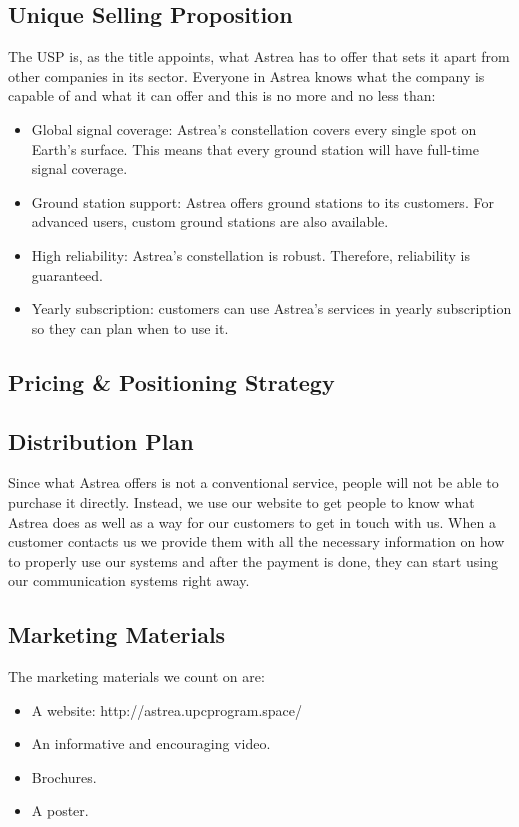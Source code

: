 \subsection{Unique Selling Proposition}
The USP is, as the title appoints, what Astrea has to offer that sets it apart from other companies in its sector. Everyone in Astrea knows what the company is capable of and what it can offer and this is no more and no less than:
\begin{itemize}
\item Global signal coverage: Astrea's constellation covers every single spot on Earth's surface. This means that every ground station will have full-time signal coverage.
\item Ground station support: Astrea offers ground stations to its customers. For advanced users, custom ground stations are also available.
\item High reliability: Astrea's constellation is robust. Therefore, reliability is guaranteed.
\item Yearly subscription: customers can use Astrea's services in yearly subscription so they can plan when to use it.
\end{itemize}
 
\subsection{Pricing \& Positioning Strategy}


\subsection{Distribution Plan}
Since what Astrea offers is not a conventional service, people will not be able to purchase it directly. Instead, we use our website to get people to know what Astrea does as well as a way for our customers to get in touch with us. When a customer contacts us we provide them with all the necessary information on how to properly use our systems and after the payment is done, they can start using our communication systems right away.

\subsection{Marketing Materials}
The marketing materials we count on are:
\begin{itemize}
\item A website: http://astrea.upcprogram.space/
\item An informative and encouraging video.
\item Brochures.
\item A poster.
\end{itemize}

